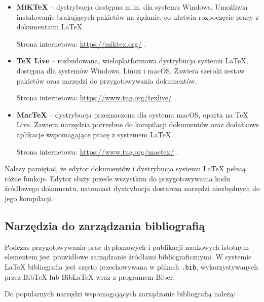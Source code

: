 \begin{itemize}

    \item \textbf{MiKTeX} -- dystrybucja dostępna m.in. dla systemu Windows. Umożliwia instalowanie brakujących pakietów na żądanie, co ułatwia rozpoczęcie pracy z dokumentami \LaTeX{}.

    Strona internetowa: \url{https://miktex.org/} \cite{MiKTeX}.

    \item \textbf{TeX Live} -- rozbudowana, wieloplatformowa dystrybucja systemu \LaTeX{}, dostępna dla systemów Windows, Linux i macOS. Zawiera szeroki zestaw pakietów oraz narzędzi do przygotowywania dokumentów.

    Strona internetowa: \url{https://www.tug.org/texlive/} \cite{Tex}.

    \item \textbf{MacTeX} -- dystrybucja przeznaczona dla systemu macOS, oparta na TeX Live. Zawiera narzędzia potrzebne do kompilacji dokumentów oraz dodatkowe aplikacje wspomagające pracę z systemem \LaTeX{}.

    Strona internetowa: \url{https://www.tug.org/mactex/} \cite{MacTeX}.

\end{itemize}

Należy pamiętać, że edytor dokumentów i dystrybucja systemu \LaTeX{} pełnią różne funkcje. Edytor służy przede wszystkim do przygotowywania kodu źródłowego dokumentu, natomiast dystrybucja dostarcza narzędzi niezbędnych do jego kompilacji.


\subsection{Narzędzia do zarządzania bibliografią}

Podczas przygotowywania prac dyplomowych i publikacji naukowych istotnym elementem jest prawidłowe zarządzanie źródłami bibliograficznymi. W systemie \LaTeX{} bibliografia jest często przechowywana w plikach \texttt{.bib}, wykorzystywanych przez BibTeX lub BibLaTeX wraz z programem Biber.

Do popularnych narzędzi wspomagających zarządzanie bibliografią należą:

